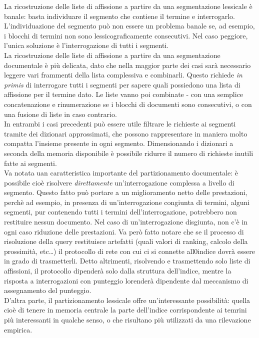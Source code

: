La ricostruzione delle liste di affissione a partire da una segmentazione lessicale è banale: basta individuare il segmento che contiene il termine e interrogarlo. L'individuazione del segmento può non essere un problema banale se, ad esempio, i blocchi di termini non sono lessicograficamente consecutivi. Nel caso peggiore, l'unica soluzione è l'interrogazione di tutti i segmenti.\\
La ricostruzione delle liste di affissione a partire da una segmentazione documentale è più delicata, dato che nella maggior parte dei casi sarà necessario leggere vari frammenti della lista complessiva e combinarli. Questo richiede \textit{in primis} di interrogare tutti i segmenti per sapere quali possiedono una lista di affissione per il termine dato. Le liste vanno poi combinate - con una semplice concatenazione e rinumerazione se i blocchi di documenti sono consecutivi, o con una fusione di liste in caso contrario.\\
In entrambi i casi precedenti può essere utile filtrare le richieste ai segmenti tramite dei dizionari approssimati, che possono rappresentare in maniera molto compatta l'insieme presente in ogni segmento. Dimensionando i dizionari a seconda della memoria disponibile è possibile ridurre il numero di richieste inutili fatte ai segmenti.\\
Va notata uan caratteristica importante del partizionamento documentale: è possibile cioè risolvere \textit{direttamente} un'interrogazione complessa a livello di segmento. Questo fatto può portare a un miglioramento netto delle prestazioni, perchè ad esempio, in presenza di un'interrogazione congiunta di termini, alguni segmenti, pur contenendo tutti i termini dell'interrogazione, potrebbero non restituire nessun documento. Nel caso di un'interrogazione disgiunta, non c'è in ogni caso riduzione delle prestazioni. Va però fatto notare che se il processo di risoluzione della query restituisce artefatti (quali valori di ranking, calcolo della prossimità, etc\dots) il protocollo di rete con cui ci si connette all0indice dovrà essere in grado di trasmetterli. Detto altrimenti, risolvendo e trasmettendo solo liste di affissioni, il protocollo dipenderà solo dalla struttura dell'indice, mentre la risposta a interrogazioni con punteggio lorenderà dipendente dal meccanismo di assegnamento del punteggio.\\
D'altra parte, il partizionamento lessicale offre un'interessante possibilità: quella cioè di tenere in memoria centrale la parte dell'indice corrispondente ai temrini più interessanti in qualche senso, o che risultano più utilizzati da una rilevazione empirica.
